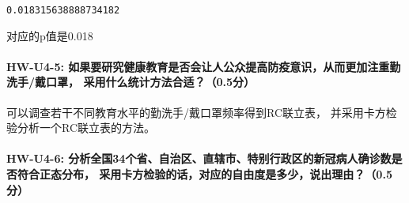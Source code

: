 \documentclass[11pt]{article}
\makeatletter
\newcommand{\boxspacing}{\kern\kvtcb@left@rule\kern\kvtcb@boxsep}
\newcommand{\prompt}[4]{
        \ttfamily\llap{{\color{#2}[#3]:\hspace{3pt}#4}}\vspace{-\baselineskip}
    }
\makeatother
\begin{document}
            \begin{tcolorbox}[breakable, size=fbox, boxrule=.5pt, pad at break*=1mm, opacityfill=0]
\prompt{Out}{outcolor}{10}{\boxspacing}
\begin{Verbatim}[commandchars=\\\{\}]
0.018315638888734182
\end{Verbatim}
\end{tcolorbox}
        
    对应的p值是0.018

    \hypertarget{hw-u4-5-ux5982ux679cux8981ux7814ux7a76ux5065ux5eb7ux6559ux80b2ux662fux5426ux4f1aux8ba9ux4ebaux516cux4f17ux63d0ux9ad8ux9632ux75abux610fux8bc6ux4eceux800cux66f4ux52a0ux6ce8ux91cdux52e4ux6d17ux624bux6234ux53e3ux7f69ux91c7ux7528ux4ec0ux4e48ux7edfux8ba1ux65b9ux6cd5ux5408ux90020.5ux5206}{%
\paragraph{HW-U4-5:
如果要研究健康教育是否会让人公众提高防疫意识，从而更加注重勤洗手/戴口罩，
采用什么统计方法合适？（0.5分）}\label{hw-u4-5-ux5982ux679cux8981ux7814ux7a76ux5065ux5eb7ux6559ux80b2ux662fux5426ux4f1aux8ba9ux4ebaux516cux4f17ux63d0ux9ad8ux9632ux75abux610fux8bc6ux4eceux800cux66f4ux52a0ux6ce8ux91cdux52e4ux6d17ux624bux6234ux53e3ux7f69ux91c7ux7528ux4ec0ux4e48ux7edfux8ba1ux65b9ux6cd5ux5408ux90020.5ux5206}}

    
    可以调查若干不同教育水平的勤洗手/戴口罩频率得到RC联立表，
    并采用卡方检验分析一个RC联立表的方法。

    \hypertarget{hw-u4-6-ux5206ux6790ux5168ux56fd34ux4e2aux7701ux81eaux6cbbux533aux76f4ux8f96ux5e02ux7279ux522bux884cux653fux533aux7684ux65b0ux51a0ux75c5ux4ebaux786eux8bcaux6570ux662fux5426ux7b26ux5408ux6b63ux6001ux5206ux5e03ux91c7ux7528ux5361ux65b9ux68c0ux9a8cux7684ux8bddux5bf9ux5e94ux7684ux81eaux7531ux5ea6ux662fux591aux5c11ux8bf4ux51faux7406ux75310.5ux5206}{%
\paragraph{HW-U4-6:
分析全国34个省、自治区、直辖市、特别行政区的新冠病人确诊数是否符合正态分布，
采用卡方检验的话，对应的自由度是多少，说出理由？（0.5分）}\label{hw-u4-6-ux5206ux6790ux5168ux56fd34ux4e2aux7701ux81eaux6cbbux533aux76f4ux8f96ux5e02ux7279ux522bux884cux653fux533aux7684ux65b0ux51a0ux75c5ux4ebaux786eux8bcaux6570ux662fux5426ux7b26ux5408ux6b63ux6001ux5206ux5e03ux91c7ux7528ux5361ux65b9ux68c0ux9a8cux7684ux8bddux5bf9ux5e94ux7684ux81eaux7531ux5ea6ux662fux591aux5c11ux8bf4ux51faux7406ux75310.5ux5206}}
\end{document}
